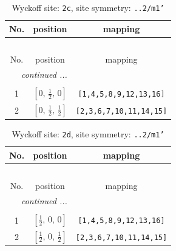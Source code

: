\documentclass[fleqn,8pt]{jsarticle}
\begin{document}
\renewcommand{\arraystretch}{1.2}
\begin{longtable}{ccc}
\caption{Wyckoff site: {\tt 2c}, site symmetry: {\tt ..2/m1'}}
 \\
 \hline \hline
No. & position & mapping \\ \hline \endfirsthead

\multicolumn{2}{l}{\tablename\ \thetable{}} \\
 \hline \hline
No. & position & mapping \\ \hline \endhead

 \hline \hline
\multicolumn{2}{r}{\footnotesize\it continued ...} \\ \endfoot

 \hline \hline
\multicolumn{2}{r}{} \\ \endlastfoot

1 & $\left[ 0,\, \frac{1}{2},\, 0 \right]$ & {\tt [1,4,5,8,9,12,13,16]} \\ \hline
2 & $\left[ 0,\, \frac{1}{2},\, \frac{1}{2} \right]$ & {\tt [2,3,6,7,10,11,14,15]} \\
\end{longtable}
\renewcommand{\arraystretch}{1.2}
\begin{longtable}{ccc}
\caption{Wyckoff site: {\tt 2d}, site symmetry: {\tt ..2/m1'}}
 \\
 \hline \hline
No. & position & mapping \\ \hline \endfirsthead

\multicolumn{2}{l}{\tablename\ \thetable{}} \\
 \hline \hline
No. & position & mapping \\ \hline \endhead

 \hline \hline
\multicolumn{2}{r}{\footnotesize\it continued ...} \\ \endfoot

 \hline \hline
\multicolumn{2}{r}{} \\ \endlastfoot

1 & $\left[ \frac{1}{2},\, 0,\, 0 \right]$ & {\tt [1,4,5,8,9,12,13,16]} \\ \hline
2 & $\left[ \frac{1}{2},\, 0,\, \frac{1}{2} \right]$ & {\tt [2,3,6,7,10,11,14,15]} \\
\end{longtable}
\renewcommand{\arraystretch}{1.2}
\end{document}
